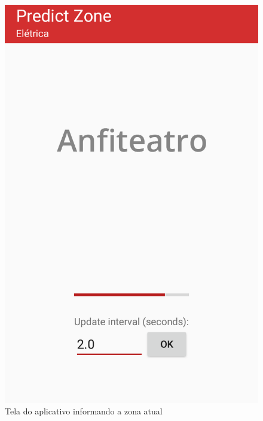 \begin{figure}[H]
\begin{minipage}[b]{0.4\textwidth}
    \includegraphics[width=\textwidth]{imagens/screenshots/result.png}
    \caption{Tela do aplicativo informando a zona atual}
  \end{minipage}
\end{figure}